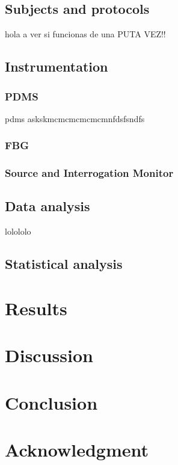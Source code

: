 \documentclass[conference]{IEEEtran}
\begin{document}
	\subsection{Subjects and protocols}
	hola a ver si funcionas de una PUTA VEZ!!
	
	\subsection{Instrumentation}
	\cite{dos}
	
	\subsubsection{PDMS}
	pdms askskmcmcmcmcmcmnfdsfsndfs
	
	
	\subsubsection{FBG}
	
	\subsubsection{Source and Interrogation Monitor}
	
	
	\subsection{Data analysis}
	lolololo
	
	\subsection{Statistical analysis}
	
	
	
	
	\section{Results}
	
	
	
	\section{Discussion}
	
	
	
	
	\section{Conclusion}
	
	
	
	
	\section*{Acknowledgment}
	
	

	\printbibliography
	
		
	
\end{document}
